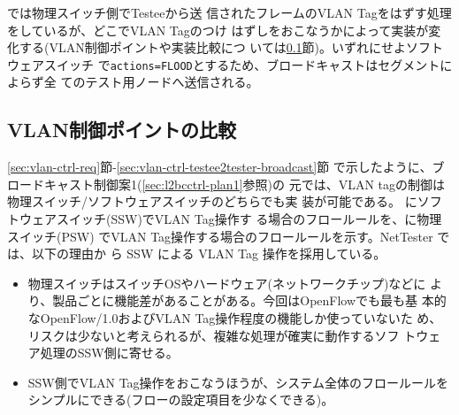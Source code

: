 では物理スイッチ側でTesteeから送
信されたフレームのVLAN Tagをはずす処理をしているが、どこでVLAN Tagのつけ
はずしをおこなうかによって実装が変化する(VLAN制御ポイントや実装比較につ
いては\ref{sec:vlan_control_point}節)。いずれにせよソフトウェアスイッチ
で\verb|actions=FLOOD|とするため、ブロードキャストはセグメントによらず全
てのテスト用ノードへ送信される。

  \subsection{VLAN制御ポイントの比較}
  \label{sec:vlan_control_point}

\ref{sec:vlan-ctrl-req}節-\ref{sec:vlan-ctrl-testee2tester-broadcast}節
で示したように、ブロードキャスト制御案1(\ref{sec:l2bcctrl-plan1}参照)の
元では、VLAN tagの制御は物理スイッチ/ソフトウェアスイッチのどちらでも実
装が可能である。
にソフトウェアスイッチ(SSW)でVLAN Tag操作す
る場合のフロールールを、に物理スイッチ(PSW)
でVLAN Tag操作する場合のフロールールを示す。NetTester では、以下の理由か
ら SSW による VLAN Tag 操作を採用している。
\begin{itemize}
 \item 物理スイッチはスイッチOSやハードウェア(ネットワークチップ)などに
       より、製品ごとに機能差があることがある。今回はOpenFlowでも最も基
       本的なOpenFlow/1.0およびVLAN Tag操作程度の機能しか使っていないた
       め、リスクは少ないと考えられるが、複雑な処理が確実に動作するソフ
       トウェア処理のSSW側に寄せる。
 \item SSW側でVLAN Tag操作をおこなうほうが、システム全体のフロールールを
       シンプルにできる(フローの設定項目を少なくできる)。
\end{itemize}

